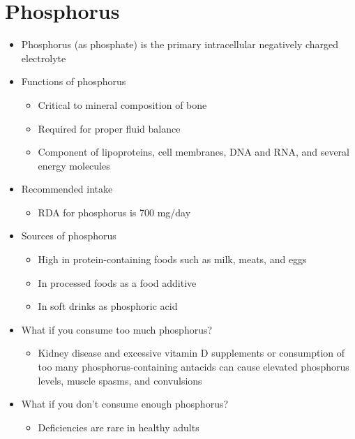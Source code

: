 \documentclass[title={Chapter 9}]{fdsn201notes}
\begin{document}
\section{Phosphorus}\label{sec:Phosphorus}
\begin{itemize}
	\item Phosphorus (as phosphate) is the primary intracellular negatively charged electrolyte
	\item Functions of phosphorus
	\begin{itemize}
		\item Critical to mineral composition of bone
		\item Required for proper fluid balance
		\item Component of lipoproteins, cell membranes, DNA and RNA, and several energy molecules
	\end{itemize}
	\item Recommended intake
	\begin{itemize}
		\item RDA for phosphorus is 700 mg/day
	\end{itemize}
	\item Sources of phosphorus
	\begin{itemize}
		\item High in protein-containing foods such as milk, meats, and eggs
		\item In processed foods as a food additive
		\item In soft drinks as phosphoric acid
	\end{itemize}
	\item What if you consume too much phosphorus?
	\begin{itemize}
		\item Kidney disease and excessive vitamin D supplements or consumption of too many phosphorus-containing antacids can cause elevated phosphorus levels, muscle spasms, and convulsions
	\end{itemize}
	\item What if you don’t consume enough phosphorus?
	\begin{itemize}
		\item Deficiencies are rare in healthy adults
	\end{itemize}
\end{itemize}
\end{document}
